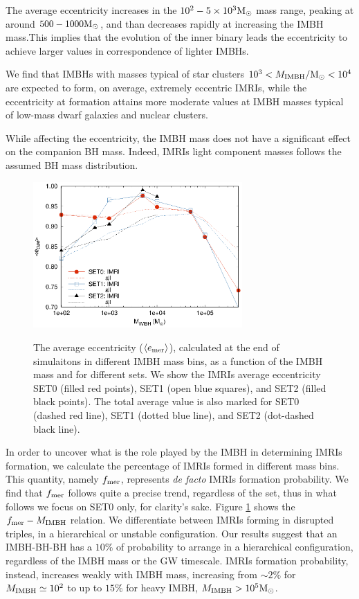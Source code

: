 \documentclass[twocolumn]{aastex62}
\newcommand{\Ms}{{\rm M}_\odot}
\newcommand{\ibh}{{\rm IMBH}}
\begin{document}
The average eccentricity increases in the $10^2-5\times10^3\Ms$ mass range, peaking at around $500-1000\Ms$, and than decreases rapidly at increasing the IMBH mass.This implies that the evolution of the inner binary leads the eccentricity to achieve larger values in correspondence of lighter IMBHs. 

We find that IMBHs with masses typical of star clusters $10^3<M_\ibh/\Ms<10^4$ are expected to form, on average, extremely eccentric IMRIs, while the eccentricity at formation attains more moderate values at IMBH masses typical of low-mass dwarf galaxies and nuclear clusters.

While affecting the eccentricity, the IMBH mass does not have a significant effect on the companion BH mass. Indeed, IMRIs light component masses follows the assumed BH mass distribution. 

\begin{figure}
\centering
\includegraphics[width=8cm]{average_ecc_sets}\\
\caption{The average eccentricity ($\langle e_{\rm mer}\rangle$), calculated at the end of simulaitons in different IMBH mass bins, as a function of the IMBH mass and for different sets. We show the IMRIs average eccentricity SET0 (filled red points), SET1 (open blue squares), and SET2 (filled black points). The total average value is also marked for SET0 (dashed red line), SET1 (dotted blue line), and SET2 (dot-dashed black line). }
\label{fig:f5}
\end{figure}

In order to uncover what is the role played by the IMBH in determining IMRIs formation, we calculate the 
percentage of IMRIs formed in different mass bins. This quantity, namely $f_{\rm mer}$, represents {\it de facto} IMRIs formation probability. We find that $f_{\rm mer}$ follows quite a precise trend, regardless of the set, thus in what follows we focus on SET0 only, for clarity's sake. Figure \ref{fig:f5} shows the $f_{\rm mer}-M_\ibh$ relation. We differentiate between IMRIs forming in disrupted triples, in a hierarchical or unstable configuration. 
Our results suggest that an IMBH-BH-BH has a $10\%$ of probability to arrange in a hierarchical configuration, regardless of the IMBH mass or the GW timescale. IMRIs formation probability, instead, increases weakly with IMBH mass, increasing from $\sim 2\%$ for $M_\ibh \simeq 10^2$ to up to $15\%$ for heavy IMBH, $M_\ibh>10^5\Ms$.
\end{document}
